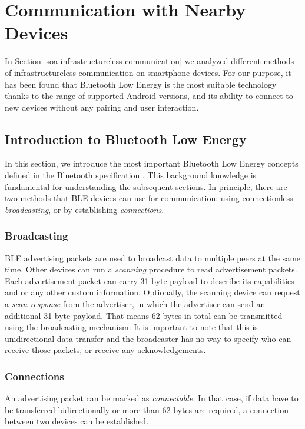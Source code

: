 \clearpage

\section{Communication with Nearby Devices}

In Section \ref{soa-infrastructureless-communication} we analyzed different methods of infrastructureless communication on smartphone devices. For our purpose, it has been found that Bluetooth Low Energy is the most suitable technology thanks to the range of supported Android versions, and its ability to connect to new devices without any pairing and user interaction.

\subsection{Introduction to Bluetooth Low Energy}

In this section, we introduce the most important Bluetooth Low Energy concepts defined in the Bluetooth specification \cite{bluetooth51spec}. This background knowledge is fundamental for understanding the subsequent sections. In principle, there are two methods that BLE devices can use for communication: using connectionless \textit{broadcasting}, or by establishing \textit{connections}.

\subsubsection{Broadcasting}

BLE advertising packets are used to broadcast data to multiple peers at the same time. Other devices can run a \textit{scanning} procedure to read advertisement packets. Each advertisement packet can carry 31-byte payload to describe its capabilities and or any other custom information. Optionally, the scanning device can request a \textit{scan response} from the advertiser, in which the advertiser can send an additional 31-byte payload. That means 62 bytes in total can be transmitted using the broadcasting mechanism. It is important to note that this is unidirectional data transfer and the broadcaster has no way to specify who can receive those packets, or receive any acknowledgements.

\subsubsection{Connections}

An advertising packet can be marked as \textit{connectable}. In that case, if data have to be transferred bidirectionally or more than 62 bytes are required, a connection between two devices can be established.

